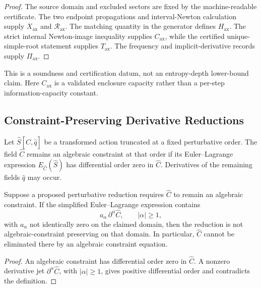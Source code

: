 \begin{proof}
The source domain and excluded sectors are fixed by the machine-readable
certificate. The two endpoint propagations and interval-Newton calculation
supply \(X_{\mathrm{ax}}\) and \(\mathcal R_{\mathrm{ax}}\). The matching
quantity in the generator defines \(H_{\mathrm{ax}}\). The strict internal
Newton-image inequality supplies \(C_{\mathrm{ax}}\), while the certified
unique-simple-root statement supplies \(T_{\mathrm{ax}}\). The frequency and
implicit-derivative records supply \(\Pi_{\mathrm{ax}}\).
\end{proof}

\begin{remark}
This is a soundness and certification datum, not an entropy-depth lower-bound
claim. Here \(C_{\mathrm{ax}}\) is a validated enclosure capacity rather than
a per-step information-capacity constant.
\end{remark}

\subsection{Constraint-Preserving Derivative Reductions}

\begin{definition}
Let \(\widehat S[\widehat C,\widehat q]\) be a transformed action truncated at a
fixed perturbative order. The field \(\widehat C\) remains an algebraic
constraint at that order if its Euler--Lagrange expression
\(E_{\widehat C}(\widehat S)\) has differential order zero in \(\widehat C\).
Derivatives of the remaining fields \(\widehat q\) may occur.
\end{definition}

\begin{theorem}
Suppose a proposed perturbative reduction requires \(\widehat C\) to remain an
algebraic constraint. If the simplified Euler--Lagrange expression contains
\[
a_{\alpha}\,\partial^{\alpha}\widehat C,
\qquad
|\alpha|\geq 1,
\]
with \(a_{\alpha}\) not identically zero on the claimed domain, then the
reduction is not algebraic-constraint preserving on that domain. In
particular, \(\widehat C\) cannot be eliminated there by an algebraic
constraint equation.
\end{theorem}

\begin{proof}
An algebraic constraint has differential order zero in \(\widehat C\).
A nonzero derivative jet \(\partial^{\alpha}\widehat C\), with
\(|\alpha|\geq 1\), gives positive differential order and contradicts the
definition.
\end{proof}

